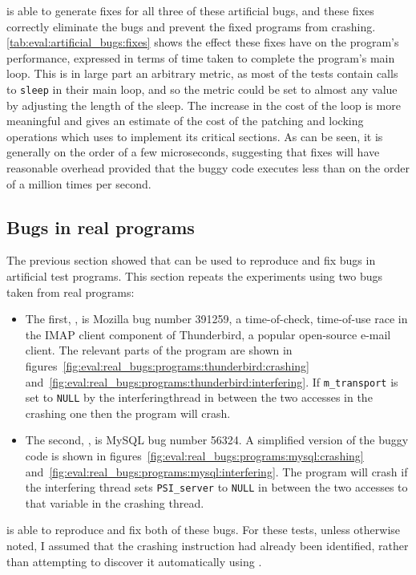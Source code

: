 \noindent
{\Technique} is able to generate fixes for all three of these
artificial bugs, and these fixes correctly eliminate the bugs and
prevent the fixed programs from crashing.
\autoref{tab:eval:artificial_bugs:fixes} shows the effect these fixes
have on the program's performance, expressed in terms of time taken to
complete the program's main loop.  This is in large part an arbitrary
metric, as most of the tests contain calls to \texttt{sleep} in their
main loop, and so the metric could be set to almost any value by
adjusting the length of the sleep.  The increase in the cost of the
loop is more meaningful and gives an estimate of the cost of the
patching and locking operations which {\implementation} uses to
implement its critical sections.  As can be seen, it is generally on
the order of a few microseconds, suggesting that {\technique} fixes
will have reasonable overhead provided that the buggy code executes
less than on the order of a million times per second.

\subsection{Bugs in real programs}

The previous section showed that {\technique} can be used to reproduce
and fix bugs in artificial test programs.  This section repeats the
experiments using two bugs taken from real programs:
\begin{itemize}
\item The first, , is Mozilla bug number
  391259\cite{Mery2007}, a time-of-check, time-of-use race in the IMAP
  client component of Thunderbird, a popular open-source e-mail
  client.  The relevant parts of the program are shown in
  figures~\ref{fig:eval:real_bugs:programs:thunderbird:crashing}
  and~\ref{fig:eval:real_bugs:programs:thunderbird:interfering}.  If
  \verb|m_transport| is set to \verb|NULL| by the
  \gls{interferingthread} in between the two accesses in the crashing
  one then the program will crash.
\item The second, , is MySQL bug number
  56324\needCite{}.  A simplified version of the buggy code is shown
  in figures~\ref{fig:eval:real_bugs:programs:mysql:crashing}
  and~\ref{fig:eval:real_bugs:programs:mysql:interfering}.  The
  program will crash if the interfering thread sets
  \texttt{PSI\_server} to \texttt{NULL} in between the two accesses to
  that variable in the crashing thread.
\end{itemize}
{\Technique} is able to reproduce and fix both of these bugs.  For
these tests, unless otherwise noted, I assumed that the crashing
instruction had already been identified, rather than attempting to
discover it automatically using {\technique}.

